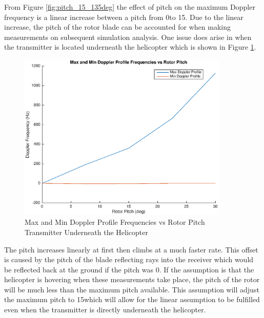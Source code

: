 From Figure \ref{fig:pitch_15_135deg} the effect of pitch on the maximum Doppler frequency is a linear increase between a pitch from 0\textdegree \space to 15\textdegree. Due to the linear increase, the pitch of the rotor blade can be accounted for when making measurements on subsequent simulation analysis. One issue does arise in when the transmitter is located underneath the helicopter which is shown in Figure \ref{fig:pitch_tx0}.

\begin{figure}
	\begin{center}
		\includegraphics[width=10cm]{images/simulation/pitch_0txPos_max_doppler.eps}
		\caption{Max and Min Doppler Profile Frequencies vs Rotor Pitch Transmitter Underneath the Helicopter}
		\label{fig:pitch_tx0}
	\end{center}
\end{figure}

The pitch increases linearly at first then climbs at a much faster rate. This offset is caused by the pitch of the blade reflecting rays into the receiver which would be reflected back at the ground if the pitch was 0\textdegree. If the assumption is that the helicopter is hovering when these measurements take place, the pitch of the rotor will be much less than the maximum pitch available. This assumption will adjust the maximum pitch to 15\textdegree \space which will allow for the linear assumption to be fulfilled even when the transmitter is directly underneath the helicopter.

